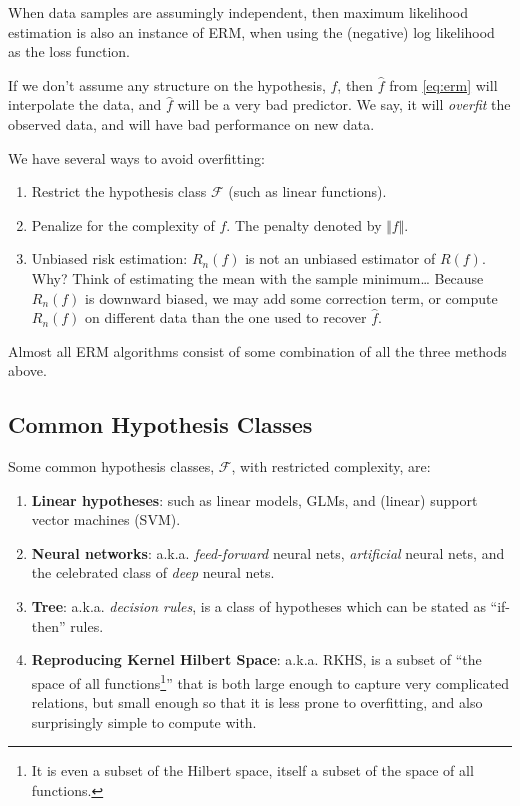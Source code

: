 \documentclass[]{book}
\providecommand{\tightlist}{%
  \setlength{\itemsep}{0pt}\setlength{\parskip}{0pt}}
\theoremstyle{definition}
\theoremstyle{definition}
\theoremstyle{definition}
\theoremstyle{remark}
\begin{document}
When data samples are assumingly independent, then maximum likelihood
estimation is also an instance of ERM, when using the (negative) log
likelihood as the loss function.

If we don't assume any structure on the hypothesis, \(f\), then
\(\hat f\) from \eqref{eq:erm} will interpolate the data, and \(\hat f\)
will be a very bad predictor. We say, it will \emph{overfit} the
observed data, and will have bad performance on new data.

We have several ways to avoid overfitting:

\begin{enumerate}
\def\labelenumi{\arabic{enumi}.}
\tightlist
\item
  Restrict the hypothesis class \(\mathcal{F}\) (such as linear
  functions).
\item
  Penalize for the complexity of \(f\). The penalty denoted by
  \(\Vert f \Vert\).
\item
  Unbiased risk estimation: \(R_n(f)\) is not an unbiased estimator of
  \(R(f)\). Why? Think of estimating the mean with the sample
  minimum\ldots{} Because \(R_n(f)\) is downward biased, we may add some
  correction term, or compute \(R_n(f)\) on different data than the one
  used to recover \(\hat f\).
\end{enumerate}

Almost all ERM algorithms consist of some combination of all the three
methods above.

\subsection{Common Hypothesis Classes}\label{common-hypothesis-classes}

Some common hypothesis classes, \(\mathcal{F}\), with restricted
complexity, are:

\begin{enumerate}
\def\labelenumi{\arabic{enumi}.}
\item
  \textbf{Linear hypotheses}: such as linear models, GLMs, and (linear)
  support vector machines (SVM).
\item
  \textbf{Neural networks}: a.k.a. \emph{feed-forward} neural nets,
  \emph{artificial} neural nets, and the celebrated class of \emph{deep}
  neural nets.
\item
  \textbf{Tree}: a.k.a. \emph{decision rules}, is a class of hypotheses
  which can be stated as ``if-then'' rules.
\item
  \textbf{Reproducing Kernel Hilbert Space}: a.k.a. RKHS, is a subset of
  ``the space of all functions\footnote{It is even a subset of the
    Hilbert space, itself a subset of the space of all functions.}''
  that is both large enough to capture very complicated relations, but
  small enough so that it is less prone to overfitting, and also
  surprisingly simple to compute with.
\end{enumerate}
\end{document}
